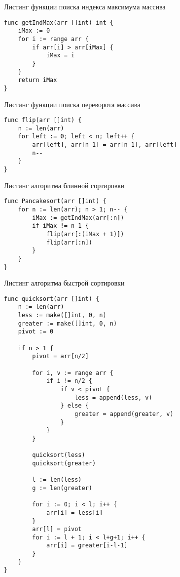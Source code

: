 \begin{code}
\caption{Листинг функции поиска индекса максимума массива}
\label{code:max}
\begin{verbatim}
func getIndMax(arr []int) int {
	iMax := 0
	for i := range arr {
		if arr[i] > arr[iMax] {
			iMax = i
		}
	}
	return iMax
}
\end{verbatim}
\end{code}

\begin{code}
\caption{Листинг функции поиска переворота массива}
\label{code:flip}
\begin{verbatim}
func flip(arr []int) {
	n := len(arr)
	for left := 0; left < n; left++ {
		arr[left], arr[n-1] = arr[n-1], arr[left]
		n--
	}
}
\end{verbatim}
\end{code}

\begin{code}
\caption{Листинг алгоритма блинной сортировки}
\label{code:pancake}
\begin{verbatim}
func Pancakesort(arr []int) {
	for n := len(arr); n > 1; n-- {
		iMax := getIndMax(arr[:n])
		if iMax != n-1 {
			flip(arr[:(iMax + 1)])
			flip(arr[:n])
		}
	}
}
\end{verbatim}
\end{code}

\begin{code}
\caption{Листинг алгоритма быстрой сортировки}
\label{code:quick}
\begin{verbatim}
func quicksort(arr []int) {
	n := len(arr)
	less := make([]int, 0, n)
	greater := make([]int, 0, n)
	pivot := 0

	if n > 1 {
		pivot = arr[n/2]

		for i, v := range arr {
			if i != n/2 {
				if v < pivot {
					less = append(less, v)
				} else {
					greater = append(greater, v)
				}
			}
		}

		quicksort(less)
		quicksort(greater)
		
		l := len(less)
		g := len(greater)

		for i := 0; i < l; i++ {
			arr[i] = less[i]
		}
		arr[l] = pivot
		for i := l + 1; i < l+g+1; i++ {
			arr[i] = greater[i-l-1]
		}
	}
}
\end{verbatim}
\end{code}

